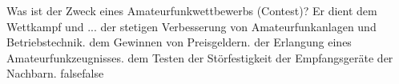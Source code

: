     {Was ist der Zweck eines Amateurfunkwettbewerbs (Contest)? Er dient dem Wettkampf und ...}
    {der stetigen Verbesserung von Amateurfunkanlagen und Betriebstechnik.}
    {dem Gewinnen von Preisgeldern.}
    {der Erlangung eines Amateurfunkzeugnisses.}
    {dem Testen der Störfestigkeit der Empfangsgeräte der Nachbarn.}
    {false}{false}